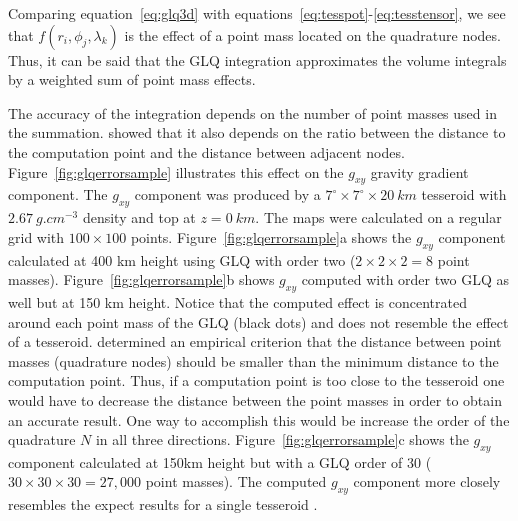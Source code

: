\documentclass[paper,twocolumn]{geophysics}
\begin{document}
Comparing equation~\ref{eq:glq3d} with
equations~\ref{eq:tesspot}-\ref{eq:tesstensor},
we see that $f(r_i, \phi_j, \lambda_k)$ is the effect of a point
mass located on the quadrature nodes.
Thus, it can be said that the GLQ integration
approximates the volume integrals  by a
weighted sum of point mass effects.

The accuracy of the integration
depends on the number of point masses used in the summation.
\citet{Ku1977} showed that it also depends on the ratio between
the distance to the computation point and the distance between adjacent nodes.
Figure~\ref{fig:glqerrorsample}
illustrates this effect on the $g_{xy}$ gravity gradient component.
The $g_{xy}$ component was produced by a
$7^\circ \times 7^\circ \times 20\ km$ tesseroid
with $2.67\ g.cm^{-3}$ density
and top at $z=0\ km$.
The maps were calculated on a regular grid
with $100\times100$ points.
Figure~\ref{fig:glqerrorsample}a shows the $g_{xy}$ component
calculated at 400 km height using
GLQ with order two ($2 \times 2 \times 2 = 8$ point masses).
Figure~\ref{fig:glqerrorsample}b shows $g_{xy}$ computed with order two
GLQ as well but at 150 km height.
Notice that the computed effect is concentrated around each point mass
of the GLQ (black dots) and does not resemble the effect of a tesseroid.
\citet{Ku1977} determined an empirical criterion that the distance between
point masses (quadrature nodes) should be smaller than the minimum distance to
the computation point.
Thus, if a computation point is too close to the tesseroid one would have to
decrease the distance between the point masses in order to obtain an accurate
result.
One way to accomplish this would be increase the order of the quadrature
$N$ in all three directions.
Figure~\ref{fig:glqerrorsample}c shows the $g_{xy}$ component calculated at
150km height but with a GLQ order of 30
($30 \times 30 \times 30 = 27,000$ point masses).
The computed $g_{xy}$ component more closely resembles
the expect results for a single tesseroid \citep{Asgharzadeh2007}.
\end{document}

